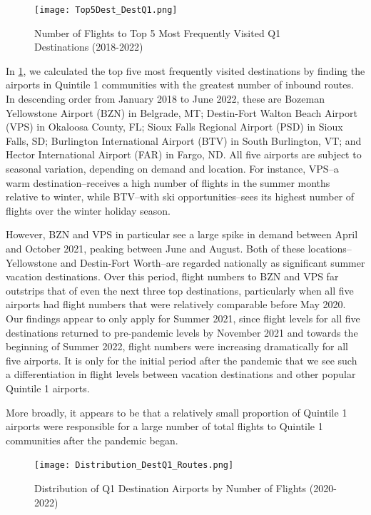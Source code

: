 \documentclass[11pt]{article}
\begin{document}
\begin{figure}[htbp]
\centerline{\texttt{[image: Top5Dest\_DestQ1.png]}}
\caption{Number of Flights to Top 5 Most Frequently Visited Q1 Destinations (2018-2022)}
\label{Top5Dest_DestQ1}
\end{figure}

In \cref{Top5Dest_DestQ1}, we calculated the top five most frequently visited destinations by finding the airports in Quintile 1 communities with the greatest number of inbound routes. In descending order from January 2018 to June 2022, these are Bozeman Yellowstone Airport (BZN) in Belgrade, MT; Destin-Fort Walton Beach Airport (VPS) in Okaloosa County, FL; Sioux Falls Regional Airport (PSD) in Sioux Falls, SD; Burlington International Airport (BTV) in South Burlington, VT; and Hector International Airport (FAR) in Fargo, ND. All five airports are subject to seasonal variation, depending on demand and location. For instance, VPS--a warm destination--receives a high number of flights in the summer months relative to winter, while BTV--with ski opportunities--sees its highest number of flights over the winter holiday season. 

\-\hspace{0.5cm} However, BZN and VPS in particular see a large spike in demand between April and October 2021, peaking between June and August. Both of these locations--Yellowstone and Destin-Fort Worth--are regarded nationally as significant summer vacation destinations. Over this period, flight numbers to BZN and VPS far outstrips that of even the next three top destinations, particularly when all five airports had flight numbers that were relatively comparable before May 2020. Our findings appear to only apply for Summer 2021, since flight levels for all five destinations returned to pre-pandemic levels by November 2021 and towards the beginning of Summer 2022, flight numbers were increasing dramatically for all five airports. It is only for the initial period after the pandemic that we see such a differentiation in flight levels between vacation destinations and other popular Quintile 1 airports.

\-\hspace{0.5cm} More broadly, it appears to be that a relatively small proportion of Quintile 1 airports were responsible for a large number of total flights to Quintile 1 communities after the pandemic began.

\begin{figure}[htbp]
\centerline{\texttt{[image: Distribution\_DestQ1\_Routes.png]}}
\caption{Distribution of Q1 Destination Airports by Number of Flights (2020-2022)}
\label{Distribution_DestQ1_Routes}
\end{figure}
\end{document}
